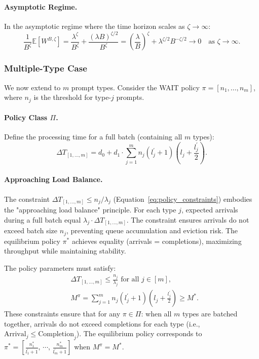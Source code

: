 \paragraph{Asymptotic Regime.} In the asymptotic regime where the time horizon scales as $\zeta \to \infty$:
$$\frac{1}{B^{\zeta}}\mathbb{E}[W^{B,\zeta}]= \frac{\lambda^{\zeta}}{B^{\zeta}} + \frac{(\lambda B)^{\zeta/2}}{B^{\zeta}} = \left(\frac{\lambda}{B}\right)^{\!\zeta} + \lambda^{\zeta/2} B^{-\zeta/2} \to 0 \quad \text{as } \zeta \to \infty.$$

\subsubsection{Multiple-Type Case}

We now extend to $m$ prompt types. Consider the WAIT policy $\pi = [n_1,\ldots,n_m]$, where $n_j$ is the threshold for type-$j$ prompts.

\paragraph{Policy Class $\Pi$.} Define the processing time for a full batch (containing all $m$ types):
\begin{equation}\label{eq:batch_time_def}
\Delta T_{[1,\ldots,m]} =  d_0 + d_1 \cdot \sum_{j=1}^m n_j(l_j^\prime+1)\left( l_j+\frac{l_j^\prime}{2} \right).
\end{equation}

\paragraph{Approaching Load Balance.}
The constraint $\Delta T_{[1,\ldots,m]} \leq n_j/\lambda_j$ (Equation~\ref{eq:policy_constraints}) embodies the "approaching load balance" principle. For each type $j$, expected arrivals during a full batch equal $\lambda_j \cdot \Delta T_{[1,\ldots,m]}$. The constraint ensures arrivals do not exceed batch size $n_j$, preventing queue accumulation and eviction risk. The equilibrium policy $\pi^*$ achieves equality (arrivals = completions), maximizing throughput while maintaining stability.

The policy parameters must satisfy:
\begin{equation}\label{eq:policy_constraints}
\begin{aligned}
&\Delta T_{[1,\ldots,m]} \leq \frac{n_j}{\lambda_j} \text{ for all } j \in [m], \\
&M^{\pi} = \sum_{j=1}^mn_j(l_j^\prime+1)\left(l_j+\frac{l_j^\prime}{2}\right)\geq  M^{*}.
\end{aligned}
\end{equation}
These constraints ensure that for any $\pi \in \Pi$: when all $m$ types are batched together, arrivals do not exceed completions for each type (i.e., $\text{Arrival}_j\leq \text{Completion}_j$). The equilibrium policy corresponds to $\pi^* = [ \frac{n_1^*}{l_1^\prime+1},\,\cdots,\,\frac{n_m^*}{l_m^\prime+1} ]$ when $M^\pi = M^*$.

